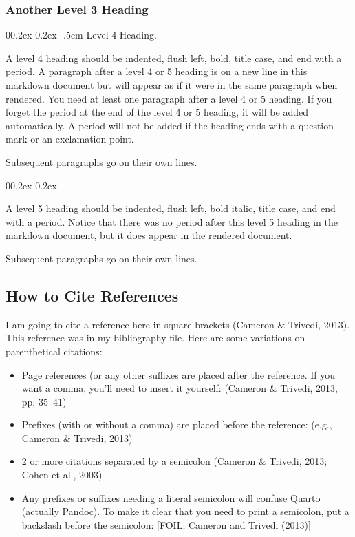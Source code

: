 \documentclass[
  man,
  colorlinks=true,linkcolor=blue,citecolor=blue,urlcolor=blue]{apa7}
\makeatletter
\renewcommand{\paragraph}{\@startsection{paragraph}{4}{\parindent}%
	{0\baselineskip \@plus 0.2ex \@minus 0.2ex}%
	{-.5em}%
	{\normalfont\normalsize\bfseries\typesectitle}}
\renewcommand{\subparagraph}[1]{\@startsection{subparagraph}{5}{0.5em}%
	{0\baselineskip \@plus 0.2ex \@minus 0.2ex}%
	{-\z@\relax}%
	{\normalfont\normalsize\bfseries\itshape\hspace{\parindent}{#1}\textit{\addperi}}{\relax}}
\makeatother
\begin{document}
\hypertarget{another-level-3-heading}{%
\subsubsection{Another Level 3 Heading}\label{another-level-3-heading}}

\hypertarget{level-4-heading.}{%
\paragraph{Level 4 Heading.}\label{level-4-heading.}}

A level 4 heading should be indented, flush left, bold, title case, and
end with a period. A paragraph after a level 4 or 5 heading is on a new
line in this markdown document but will appear as if it were in the same
paragraph when rendered. You need at least one paragraph after a level 4
or 5 heading. If you forget the period at the end of the level 4 or 5
heading, it will be added automatically. A period will not be added if
the heading ends with a question mark or an exclamation point.

Subsequent paragraphs go on their own lines.

\hypertarget{level-5-heading}{%
\subparagraph{Level 5 Heading.}\label{level-5-heading}}

A level 5 heading should be indented, flush left, bold italic, title
case, and end with a period. Notice that there was no period after this
level 5 heading in the markdown document, but it does appear in the
rendered document.

Subsequent paragraphs go on their own lines.

\hypertarget{how-to-cite-references}{%
\subsection{How to Cite References}\label{how-to-cite-references}}

I am going to cite a reference here in square brackets (Cameron \&
Trivedi, 2013). This reference was in my bibliography file. Here are
some variations on parenthetical citations:

\begin{itemize}
\item
  Page references (or any other suffixes are placed after the reference.
  If you want a comma, you'll need to insert it yourself: (Cameron \&
  Trivedi, 2013, pp. 35--41)
\item
  Prefixes (with or without a comma) are placed before the reference:
  (e.g., Cameron \& Trivedi, 2013)
\item
  2 or more citations separated by a semicolon (Cameron \& Trivedi,
  2013; Cohen et al., 2003)
\item
  Any prefixes or suffixes needing a literal semicolon will confuse
  Quarto (actually Pandoc). To make it clear that you need to print a
  semicolon, put a backslash before the semicolon: {[}FOIL; Cameron and
  Trivedi (2013){]}
\end{itemize}
\end{document}
